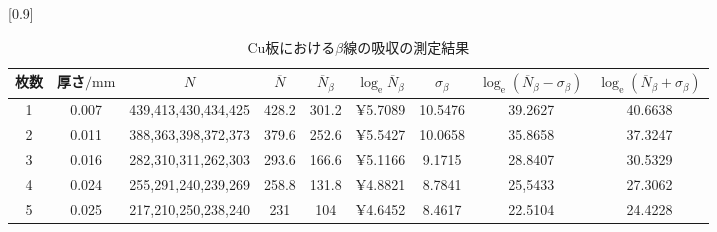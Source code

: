 \documentclass[a4j,10pt]{jarticle}
\begin{document}
    \begin{table}[h]
      \label{Cukeisoku}
      \begin{center}
      \caption{Cu板における$\beta$線の吸収の測定結果}
      \scalebox{0.6}[0.9]{
        \begin{tabular}{ccccccccc}
        \hline
        枚数 & 厚さ$/\mathrm{mm}$ & $N$ & $\overline{N}$ & $\overline{N}_{\beta}$ & $\log_{\mathrm{e}}\overline{N}_{\beta}$ & $\sigma_{\beta}$ & $\log_{\mathrm{e}}(\overline{N}_{\beta}-\sigma_{\beta})$ & $\log_{\mathrm{e}}(\overline{N}_{\beta}+\sigma_{\beta})$ \\ \hline
        1 & 0.007 & 439,413,430,434,425 & 428.2 & 301.2& ¥5.7089 & 10.5476 & 39.2627 & 40.6638 \\
        2 & 0.011 & 388,363,398,372,373 & 379.6 & 252.6 & ¥5.5427 & 10.0658 & 35.8658 & 37.3247 \\
        3 & 0.016 & 282,310,311,262,303 & 293.6 & 166.6 & ¥5.1166 & 9.1715 & 28.8407 & 30.5329 \\
        4 & 0.024 & 255,291,240,239,269 & 258.8 & 131.8 & ¥4.8821 & 8.7841 & 25,5433 & 27.3062 \\
        5 & 0.025 & 217,210,250,238,240 & 231 & 104 & ¥4.6452 & 8.4617 & 22.5104 & 24.4228 \\
        \hline
        \end{tabular}
      }
      \end{center}
    \end{table}
\end{document}

